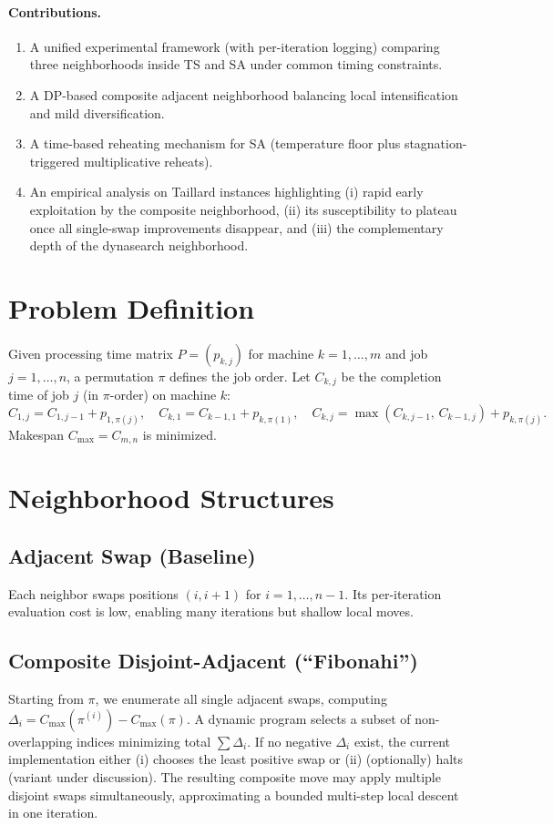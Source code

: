 \documentclass[runningheads]{llncs}
\begin{document}
\paragraph{Contributions.}
\begin{enumerate}
  \item A unified experimental framework (with per-iteration logging) comparing three neighborhoods inside TS and SA under common timing constraints.
  \item A DP-based composite adjacent neighborhood balancing local intensification and mild diversification.
  \item A time-based reheating mechanism for SA (temperature floor plus stagnation-triggered multiplicative reheats).
  \item An empirical analysis on Taillard instances highlighting (i) rapid early exploitation by the composite neighborhood, (ii) its susceptibility to plateau once all single-swap improvements disappear, and (iii) the complementary depth of the dynasearch neighborhood.
\end{enumerate}

\section{Problem Definition}
Given processing time matrix $P = (p_{k,j})$ for machine $k=1,\dots,m$ and job $j=1,\dots,n$, a permutation $\pi$ defines the job order. Let $C_{k,j}$ be the completion time of job $j$ (in $\pi$-order) on machine $k$:
\[
C_{1,j} = C_{1,j-1} + p_{1,\pi(j)},\quad
C_{k,1} = C_{k-1,1} + p_{k,\pi(1)},\quad
C_{k,j} = \max(C_{k,j-1},\, C_{k-1,j}) + p_{k,\pi(j)}.
\]
Makespan $C_{\max} = C_{m,n}$ is minimized.

\section{Neighborhood Structures}
\subsection{Adjacent Swap (Baseline)}
Each neighbor swaps positions $(i,i{+}1)$ for $i=1,\dots,n-1$. Its per-iteration evaluation cost is low, enabling many iterations but shallow local moves.

\subsection{Composite Disjoint-Adjacent (``Fibonahi'')}
Starting from $\pi$, we enumerate all single adjacent swaps, computing $\Delta_i = C_{\max}(\pi^{(i)}) - C_{\max}(\pi)$. A dynamic program selects a subset of non-overlapping indices minimizing total $\sum \Delta_i$. If no negative $\Delta_i$ exist, the current implementation either (i) chooses the least positive swap or (ii) (optionally) halts (variant under discussion). The resulting composite move may apply multiple disjoint swaps simultaneously, approximating a bounded multi-step local descent in one iteration.
\end{document}
